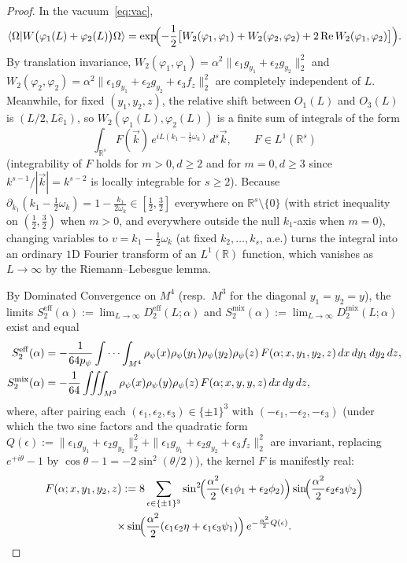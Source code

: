 \documentclass[11pt,a4paper]{article}
\theoremstyle{definition}
\theoremstyle{remark}
\newcommand{\RR}{\mathbb{R}}
\newcommand{\braket}[2]{\langle #1 | #2 \rangle}
\newcommand{\norm}[1]{\|#1\|}
\begin{document}
\begin{proof}
In the vacuum~\eqref{eq:vac},
\[
\braket{\Omega}{W\bigl(\varphi_1(L)+\varphi_2(L)\bigr)\Omega}
= \exp\!\Bigl(-\frac{1}{2}\bigl[W_2(\varphi_1,\varphi_1) + W_2(\varphi_2,\varphi_2) + 2\operatorname{Re} W_2(\varphi_1,\varphi_2)\bigr]\Bigr).
\]
By translation invariance, $W_2(\varphi_1,\varphi_1) = \alpha^2\norm{\epsilon_1 g_{y_1}+\epsilon_2 g_{y_2}}_2^2$ and $W_2(\varphi_2,\varphi_2) = \alpha^2\norm{\epsilon_1 g_{y_1}+\epsilon_2 g_{y_2}+\epsilon_3 f_z}_2^2$ are completely independent of $L$. Meanwhile, for fixed $(y_1,y_2,z)$, the relative shift between $O_1(L)$ and $O_3(L)$ is $(L/2, L\hat{e}_1)$, so $W_2(\varphi_1(L), \varphi_2(L))$ is a finite sum of integrals of the form
\[
\int_{\RR^s} F(\vec{k})\,e^{i L(k_1 - \frac{1}{2}\omega_k)}\,d^s\vec{k}, \qquad F\in L^1(\RR^s)
\]
(integrability of $F$ holds for $m>0, d\ge 2$ and for $m=0, d\ge 3$ since $k^{s-1}/|\vec{k}| = k^{s-2}$ is locally integrable for $s\ge 2$). Because $\partial_{k_1}(k_1 - \frac{1}{2}\omega_k) = 1 - \frac{k_1}{2\omega_k} \in [\frac{1}{2}, \frac{3}{2}]$ everywhere on $\RR^s\setminus\{0\}$ (with strict inequality on $(\frac{1}{2},\frac{3}{2})$ when $m>0$, and everywhere outside the null $k_1$-axis when $m=0$), changing variables to $v = k_1 - \frac{1}{2}\omega_k$ (at fixed $k_2,\dots,k_s$, a.e.) turns the integral into an ordinary $1$D Fourier transform of an $L^1(\RR)$ function, which vanishes as $L\to\infty$ by the Riemann--Lebesgue lemma.

By Dominated Convergence on $M^4$ (resp.\ $M^3$ for the diagonal $y_1 = y_2 = y$), the limits $S_2^{\mathrm{eff}}(\alpha) := \lim_{L\to\infty} D_2^{\mathrm{eff}}(L;\alpha)$ and $S_2^{\mathrm{mix}}(\alpha) := \lim_{L\to\infty} D_2^{\mathrm{mix}}(L;\alpha)$ exist and equal
\begin{align}
S_2^{\mathrm{eff}}(\alpha) &= -\frac{1}{64 p_\psi}\idotsint_{M^4} \rho_\psi(x)\rho_\psi(y_1)\rho_\psi(y_2)\rho_\psi(z)\,F(\alpha; x,y_1,y_2,z)\,dx\,dy_1\,dy_2\,dz, \label{eq:S2-int-eff}\\
S_2^{\mathrm{mix}}(\alpha) &= -\frac{1}{64}\iiint_{M^3} \rho_\psi(x)\rho_\psi(y)\rho_\psi(z)\,F(\alpha; x,y,y,z)\,dx\,dy\,dz, \label{eq:S2-int-mix}
\end{align}
where, after pairing each $(\epsilon_1,\epsilon_2,\epsilon_3)\in\{\pm 1\}^3$ with $(-\epsilon_1,-\epsilon_2,-\epsilon_3)$ (under which the two sine factors and the quadratic form $Q(\epsilon) := \norm{\epsilon_1 g_{y_1}+\epsilon_2 g_{y_2}}_2^2 + \norm{\epsilon_1 g_{y_1}+\epsilon_2 g_{y_2}+\epsilon_3 f_z}_2^2$ are invariant, replacing $e^{+i\theta}-1$ by $\cos\theta - 1 = -2\sin^2(\theta/2)$), the kernel $F$ is manifestly real:
\begin{multline}\label{eq:F-kernel}
F(\alpha; x,y_1,y_2,z) := 8\sum_{\epsilon\in\{\pm 1\}^3} \sin^2\!\Bigl(\frac{\alpha^2}{2}(\epsilon_1\phi_1+\epsilon_2\phi_2)\Bigr)\sin\!\Bigl(\frac{\alpha^2}{2}\epsilon_2\epsilon_3\psi_2\Bigr) \\
\times \sin\!\Bigl(\frac{\alpha^2}{2}(\epsilon_1\epsilon_2\eta+\epsilon_1\epsilon_3\psi_1)\Bigr)\,e^{-\frac{\alpha^2}{2}Q(\epsilon)}.
\end{multline}


\end{proof}
\end{document}
